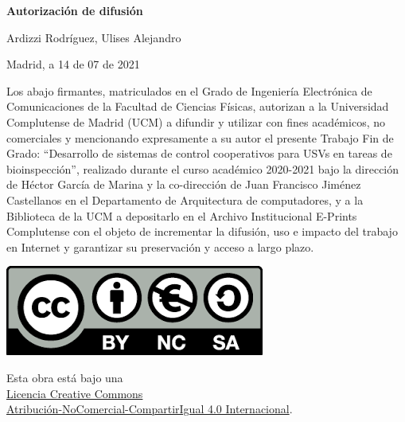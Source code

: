 % 
\newpage
\thispagestyle{empty}
\mbox{}
\newpage

\thispagestyle{empty}

\begin{center}

{\bf \Huge Autorización de difusión}

\vspace{1cm}

% 
   \large Ardizzi Rodríguez, Ulises Alejandro\\

   \vspace{0.5cm}

% 
   Madrid, a 14 de 07 de 2021\\

   \vspace{0.5cm} \end{center}

Los abajo firmantes, matriculados en el Grado de Ingeniería Electrónica de Comunicaciones de la
Facultad de Ciencias Físicas, autorizan a la Universidad Complutense de Madrid (UCM) a
difundir y utilizar con fines académicos, no comerciales y mencionando
expresamente a su autor el presente Trabajo Fin de Grado: “Desarrollo de sistemas de control cooperativos para USVs en tareas de bioinspección”, realizado
durante el curso académico 2020-2021 bajo la dirección de Héctor García de Marina y la co-dirección de Juan Francisco Jiménez Castellanos en el Departamento de Arquitectura de computadores, y a la
Biblioteca de la UCM a depositarlo en el Archivo Institucional E-Prints
Complutense con el objeto de incrementar la difusión, uso e impacto del trabajo
en Internet y garantizar su preservación y acceso a largo plazo.

{
\begin{center}
\vfill
\includegraphics{figures/cc-by-nc-sa.png}
\tiny

Esta obra está bajo una\\
\href{http://creativecommons.org/licenses/by-nc-sa/4.0/}{Licencia Creative Commons\\Atribución-NoComercial-CompartirIgual 4.0 Internacional}.
\end{center}
}